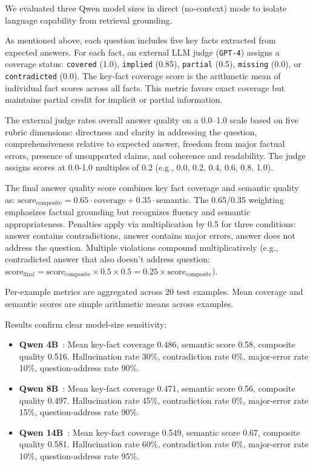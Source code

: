 \documentclass[conference]{IEEEtran}
\begin{document}
We evaluated three Qwen model sizes in direct (no-context) mode to isolate language capability from retrieval grounding.

As mentioned above, each question includes five key facts extracted from expected answers. For each fact, an external LLM judge (\texttt{GPT-4}) assigns a coverage status: \texttt{covered} (1.0), \texttt{implied} (0.85), \texttt{partial} (0.5), \texttt{missing} (0.0), or \texttt{contradicted} (0.0). The key-fact coverage score is the arithmetic mean of individual fact scores across all facts. This metric favors exact coverage but maintains partial credit for implicit or partial information.

The external judge rates overall answer quality on a 0.0--1.0 scale based on five rubric dimensions: directness and clarity in addressing the question, comprehensiveness relative to expected answer, freedom from major factual errors, presence of unsupported claims, and coherence and readability. The judge assigns scores at 0.0-1.0 multiples of 0.2 (e.g., 0.0, 0.2, 0.4, 0.6, 0.8, 1.0).

The final answer quality score combines key fact coverage and semantic quality as: $\text{score}_{\text{composite}} = 0.65 \cdot \text{coverage} + 0.35 \cdot \text{semantic}$. The 0.65/0.35 weighting emphasizes factual grounding but recognizes fluency and semantic appropriateness. Penalties apply via multiplication by 0.5 for three conditions: answer contains contradictions, answer contains major errors, answer does not address the question. Multiple violations compound multiplicatively (e.g., contradicted answer that also doesn't address question: $\text{score}_{\text{final}} = \text{score}_{\text{composite}} \times 0.5 \times 0.5 = 0.25 \times \text{score}_{\text{composite}}$).

Per-example metrics are aggregated across 20 test examples. Mean coverage and semantic scores are simple arithmetic means across examples.

Results confirm clear model-size sensitivity:

\begin{itemize}
    \item \textbf{Qwen 4B}~\cite{qwen3_4b}: Mean key-fact coverage 0.486, semantic score 0.58, composite quality 0.516. Hallucination rate 30\%, contradiction rate 0\%, major-error rate 10\%, question-address rate 90\%.
    
    \item \textbf{Qwen 8B}~\cite{qwen3_8b}: Mean key-fact coverage 0.471, semantic score 0.56, composite quality 0.497. Hallucination rate 45\%, contradiction rate 0\%, major-error rate 15\%, question-address rate 90\%.
    
    \item \textbf{Qwen 14B}~\cite{qwen3_14b}: Mean key-fact coverage 0.549, semantic score 0.67, composite quality 0.581. Hallucination rate 60\%, contradiction rate 0\%, major-error rate 10\%, question-address rate 95\%.
\end{itemize}
\end{document}
